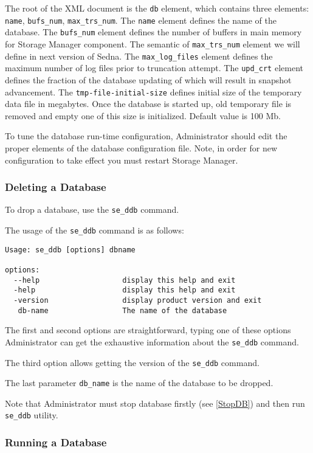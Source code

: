 \documentclass[a4paper,12pt]{article}
\begin{document}
The root of the XML document is the \verb!db! element, which contains three elements: \verb!name!, \verb!bufs_num!, \verb!max_trs_num!. The \verb!name! element defines the name of the database. The \verb!bufs_num! element defines the number of buffers in main memory for Storage Manager component. The semantic of \verb!max_trs_num! element we will define in next version of Sedna. The \verb!max_log_files! element defines the maximum number of log files prior to truncation attempt. The \verb!upd_crt! element defines the fraction of the database updating of which will result in snapshot advancement.
The \verb!tmp-file-initial-size! defines initial size of the temporary data file in megabytes. Once the database is started up, old temporary file is removed and empty one of this size is initialized. Default value is 100 Mb.

To tune the database run-time configuration, Administrator should edit the proper elements of the database configuration file. Note, in order for new configuration to take effect you must restart Storage Manager.

\subsubsection{Deleting a Database}

To drop a database, use the \verb!se_ddb! command.

The usage of the \verb!se_ddb! command is as follows:

\begin{verbatim}
Usage: se_ddb [options] dbname

options:
  --help                   display this help and exit
  -help                    display this help and exit
  -version                 display product version and exit
   db-name                 The name of the database
\end{verbatim}

The first and second options are straightforward, typing one of these options Administrator can get the exhaustive information about the \verb!se_ddb! command.

The third option allows getting the version of the \verb!se_ddb! command.

The last parameter \verb!db_name! is the name of the database to be dropped.

Note that Administrator must stop database firstly (see \ref{StopDB}) and then run \verb!se_ddb! utility.

\subsubsection{Running a Database}
\label{RunDB}
\end{document}
